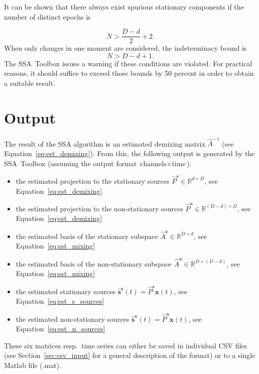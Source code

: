 \documentclass{article}
\newcommand{\R}{\ensuremath{\mathds{R}}}
\newcommand{\1}{\ensuremath{\mathds{1}}}
\newcommand{\s}{\ensuremath{\mathfrak{s}}}
\newcommand{\n}{\ensuremath{\mathfrak{n}}}
\newcommand{\0}{\ensuremath{0}}
\begin{document}
It can be shown \cite{PRL:SSA:2009} that there always exist spurious stationary components
if the number of distinct epochs is
 
\begin{equation*}
	N > \frac{D-d}{2} + 2.
\end{equation*}
When only changes in one moment are considered, the indeterminacy bound is
\begin{equation*}
	N > D-d + 1 .
\end{equation*}
The SSA~Toolbox issues a warning if these conditions are violated.
For practical reasons, it should suffice to exceed those bounds by 50
percent in order to obtain a suitable result.

\section{Output}

The result of the SSA algorithm is an estimated demixing matrix $\hat{A}^{-1}$
(see Equation~\ref{eq:est_demixing}). From this, the following output
is generated by the SSA~Toolbox (assuming the output format $\text{channels} \times \text{time}$):
\begin{itemize}
	\item the estimated projection to the stationary sources $\hat{P}^\s \in \R^{d \times D}$, 
				see Equation~\ref{eq:est_demixing}
						
	\item the estimated projection to the non-stationary sources $\hat{P}^\n \in \R^{ (D-d) \times D}$, 
		see Equation~\ref{eq:est_demixing}

	\item the estimated basis of the stationary subspace $\hat{A}^\s \in \R^{D \times d}$, 
		see Equation~\ref{eq:est_mixing}
	
	\item the estimated basis of the non-stationary subspace $\hat{A}^\n \in \R^{D \times (D-d)}$,
		see Equation~\ref{eq:est_mixing}

	\item the estimated stationary sources $\hat{\mathbf s}^\s(t) = \hat{P}^\s {\mathbf x}(t)$, 
		see Equation~\ref{eq:est_s_sources}
	
	\item the estimated non-stationary sources $\hat{\mathbf s}^\n(t) = \hat{P}^\n {\mathbf x}(t) $,
		see Equation~\ref{eq:est_n_sources}
	
\end{itemize}
These six matrices resp.~time series can either be saved in individual CSV files 
(see Section~\ref{sec:csv_input} for a general description of the format) or to a single
Matlab file (.mat). 
\end{document}
